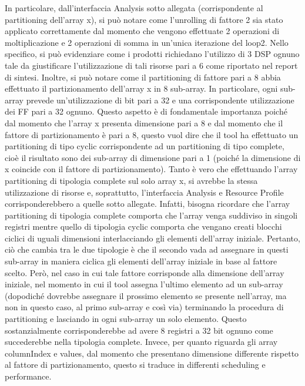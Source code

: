 In particolare, dall'interfaccia Analysis sotto allegata (corrispondente al partitioning dell'array x), si può notare come l'unrolling di fattore 2 sia stato applicato correttamente dal momento che vengono effettuate 2 operazioni di moltiplicazione e 2 operazioni di somma in un'unica iterazione del loop2. Nello specifico, si può evidenziare come i prodotti richiedano l'utilizzo di 3 DSP ognuno tale da giustificare l'utilizzazione di tali risorse pari a 6 come riportato nel report di sintesi. Inoltre, si può notare come il partitioning di fattore pari a 8 abbia effettuato il partizionamento dell'array x in 8 sub-array. In particolare, ogni sub-array prevede un'utilizzazione di bit pari a 32 e una corrispondente utilizzazione dei FF pari a 32 ognuno. Questo aspetto è di fondamentale importanza poiché dal momento che l'array x presenta dimensione pari a 8 e dal momento che il fattore di partizionamento è pari a 8, questo vuol dire che il tool ha effettuato un partitioning di tipo cyclic corrispondente ad un partitioning di tipo complete, cioè il risultato sono dei sub-array di dimensione pari a 1 (poiché la dimensione di x coincide con il fattore di partizionamento). Tanto è vero che effettuando l'array partitioning di tipologia complete sul solo array x, si avrebbe la stessa utilizzazione di risorse e, soprattutto, l'interfaccia Analysis e Resource Profile corrisponderebbero a quelle sotto allegate. Infatti, bisogna ricordare che l'array partitioning di tipologia complete comporta che l'array venga suddiviso in singoli registri mentre quello di tipologia cyclic comporta che vengano creati blocchi ciclici di uguali dimensioni interlacciando gli elementi dell'array iniziale. Pertanto, ciò che cambia tra le due tipologie è che il secondo vada ad assegnare in questi sub-array in maniera ciclica gli elementi dell'array iniziale in base al fattore scelto. Però, nel caso in cui tale fattore corrisponde alla dimensione dell'array iniziale, nel momento in cui il tool assegna l'ultimo elemento ad un sub-array (dopodiché dovrebbe assegnare il prossimo elemento se presente nell'array, ma non in questo caso, al primo sub-array e così via) terminando la procedura di partitioning e lasciando in ogni sub-array un solo elemento. Questo sostanzialmente corrisponderebbe ad avere 8 registri a 32 bit ognuno come succederebbe nella tipologia complete. Invece, per quanto riguarda gli array columnIndex e values, dal momento che presentano dimensione differente rispetto al fattore di partizionamento, questo si traduce in differenti scheduling e performance.

